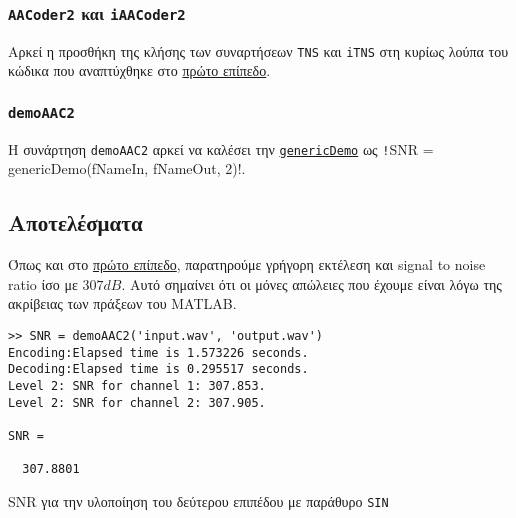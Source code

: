 \subsubsection{\texttt{AACoder2} και \texttt{iAACoder2}}
Αρκεί η προσθήκη της κλήσης των συναρτήσεων \texttt{TNS} και \texttt{iTNS} στη κυρίως λούπα του κώδικα που αναπτύχθηκε στο \hyperref[sub:AACoder1]{πρώτο επίπεδο}.

\subsubsection{\texttt{demoAAC2}}
Η συνάρτηση \texttt{demoAAC2} αρκεί να καλέσει την \hyperref[genericDemo]{\texttt{genericDemo}}
ως \texttt!SNR = genericDemo(fNameIn, fNameOut, 2)!.

\subsection{Αποτελέσματα}
Όπως και στο \hyperref[sub:results1]{πρώτο επίπεδο},
παρατηρούμε γρήγορη εκτέλεση και signal to noise ratio ίσο με $307 dB$.
Αυτό σημαίνει ότι οι μόνες απώλειες που έχουμε είναι λόγω της ακρίβειας των πράξεων του MATLAB.
\begin{code}
\begin{verbatim}
>> SNR = demoAAC2('input.wav', 'output.wav')
Encoding:Elapsed time is 1.573226 seconds.
Decoding:Elapsed time is 0.295517 seconds.
Level 2: SNR for channel 1: 307.853.
Level 2: SNR for channel 2: 307.905.

SNR =

  307.8801
\end{verbatim}
\caption{SNR για την υλοποίηση του δεύτερου επιπέδου με παράθυρο \texttt{SIN}}
\end{code}
